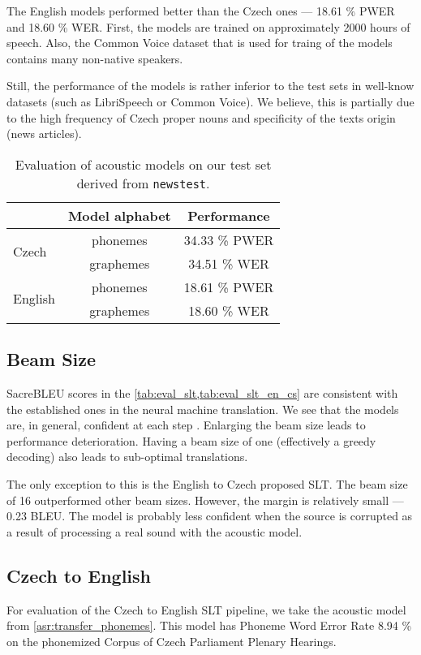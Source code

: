 The English models performed better than the Czech ones --- 18.61 \% PWER and 18.60 \% WER. First, the models are trained on approximately 2000 hours of speech. Also, the Common Voice dataset that is used for traing of the models contains many non-native speakers.

Still, the performance of the models is rather inferior to the test sets in well-know datasets (such as LibriSpeech or Common Voice). We believe, this is partially due to the high frequency of Czech proper nouns and specificity of the texts origin (news articles). 

\begin{table}[t]
	\centering
	\begin{tabular}{lc|c}
		& Model alphabet & Performance   \\ \hline
		\multirow{2}{*}{Czech}   & phonemes       & 34.33 \% PWER \\
		& graphemes      & 34.51 \% WER  \\ \hline
		\multirow{2}{*}{English} & phonemes       & 18.61 \% PWER \\
		& graphemes      & 18.60 \% WER 
	\end{tabular}
	\caption[Acoustic models performance on \texttt{read-newstest}]{Evaluation of acoustic models on our test set derived from \texttt{news\-test}.}
	\label{tab:acoustic_eval}
\end{table}

\subsection{Beam Size} 
SacreBLEU scores in the \cref{tab:eval_slt,tab:eval_slt_en_cs} are consistent with the established ones in the neural machine translation. We see that the models are, in general, confident at each step . Enlarging the beam size leads to performance deterioration. Having a beam size of one (effectively a greedy decoding) also leads to sub-optimal translations.

The only exception to this is the English to Czech proposed SLT. The beam size of 16 outperformed other beam sizes. However, the margin is relatively small --- 0.23 BLEU. The model is probably less confident when the source is corrupted as a result of processing a real sound with the acoustic model.

\subsection{Czech to English}
For evaluation of the Czech to English SLT pipeline, we take the acoustic model from \cref{asr:transfer_phonemes}. This model has Phoneme Word Error Rate 8.94 \% on the phonemized Corpus of Czech Parliament Plenary Hearings.


